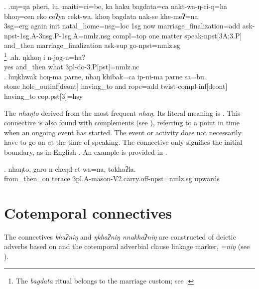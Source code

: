 \ex. \ag.uŋ=ŋa pheri, lu, maiti=ci=be, ka haku bagdata=ca nakt-wa-ŋ-ci-ŋ=ha bhoŋ=cen eko ceʔya cekt-wa. khoŋ bagdata  nak-se khe-meʔ=na.\\
{\sc 3sg=erg} again {\sc init} natal\_home{\sc =nsg=loc} {\sc 1sg} now marriage\_finalization{\sc =add} ask{\sc -npst-1sg.A-3nsg.P-1sg.A=nmlz.nsg} {\sc compl=top} one matter speak{\sc -npst[3A;3.P]} and\_then marriage\_finalization ask{\sc -sup} go{\sc [3]-npst=nmlz.sg}\\
\footnote{The \emph{bagdata} ritual belongs to the  marriage custom; see .} 
\bg.ah.    ŋkhoŋ    i    n-jog-u=ha?\\
yes and\_then what {\sc 3pl-}do{\sc -3.P[pst]=nmlz.nc}\\
 
\bg. luŋkhwak hoŋ-ma                pʌrne, nhaŋ     khibak=ca        ip-ni-ma                       pʌrne    sa=bu.\\
stone hole\_out{\sc inf[deont]} having\_to and rope{\sc =add} twist{\sc -compl-inf[deont]} having\_to {\sc cop.pst[3]=hsy}\\
 


The  \emph{nhaŋto} derived from the most frequent  \emph{nhaŋ}. Its literal meaning is . This connective is also found with complements (see ), referring to a point in time when an ongoing event has started. The event or activity does not necessarily have to go on at the time of speaking. The connective only signifies the initial boundary, as in English . An example is provided in \Next.
 
\exg. nhaŋto, garo    n-cheŋd-et-wa=na,  tokhaʔla.\\
from\_then\_on terace {\sc 3pl.A-}mason{\sc -V2.carry.off-npst=nmlz.sg} upwards\\
 

\section{Cotemporal connectives} 

The  connectives \emph{khaʔniŋ} and \emph{ŋkhaʔniŋ \ti nnakhaʔniŋ} are constructed of deictic adverbs based on  and the cotemporal adverbial clause linkage marker, \emph{=niŋ} (see \Next).

